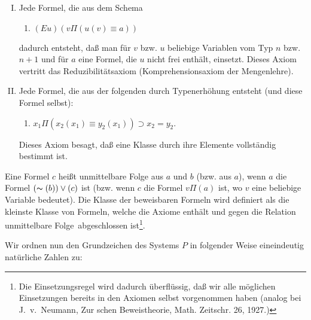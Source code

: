 \documentclass[draft]{scrartcl}
\begin{document}
\begin{enumerate}[I.]
	\item Jede Formel, die aus dem Schema

	\begin{enumerate}[1.]
		\item $\left(Eu\right)\left(v\Pi\left(u\left(v\right) \equiv a\right)\right)$
	\end{enumerate}

	dadurch entsteht, daß man für $v$ bzw. $u$ 
	beliebige Variablen  vom Typ $n$ 
	bzw. $n + 1$ und für $a$ eine Formel, die $u$
	nicht frei enthält, einsetzt. Dieses Axiom
	vertritt das Reduzibilitätsaxiom 
	(Komprehensionsaxiom der Mengenlehre).

	\item Jede Formel, die aus der folgenden durch 
		Typenerhöhung entsteht (und diese Formel selbst):

	\begin{enumerate}[1.]
		\item $x_1\Pi\left(x_2\left(x_1\right)\equiv y_2\left(x_1\right)\right) \supset x_2 = y_2$.
	\end{enumerate}
	
	Dieses Axiom besagt, daß eine Klasse durch
	ihre Elemente vollständig bestimmt ist.
\end{enumerate}

Eine Formel $c$ heißt unmittelbare Folge aus $a$ und $b$
(bzw. aus $a$), wenn $a$ die Formel $\left(\thicksim\left(b\right)\right)\lor\left(c\right)$
ist (bzw. wenn $c$ die Formel $v\Pi\left(a\right)$ ist,
wo $v$ eine beliebige Variable bedeutet). Die Klasse
der beweisbaren Formeln wird definiert als die kleinste
Klasse von Formeln, welche die Axiome enthält und gegen
die Relation \glqq unmittelbare Folge\grqq\ abgeschlossen
ist\footnote{\label{fussnote24}Die Einsetzungsregel wird
dadurch überflüssig, daß wir alle möglichen Einsetzungen
bereits in den Axiomen selbst vorgenommen haben (analog bei
J.~v.~Neumann, Zur schen Beweistheorie, Math. Zeitschr. 26, 1927.)}.

Wir ordnen nun den Grundzeichen des Systems $P$ in
folgender Weise eineindeutig natürliche Zahlen zu:
\end{document}
